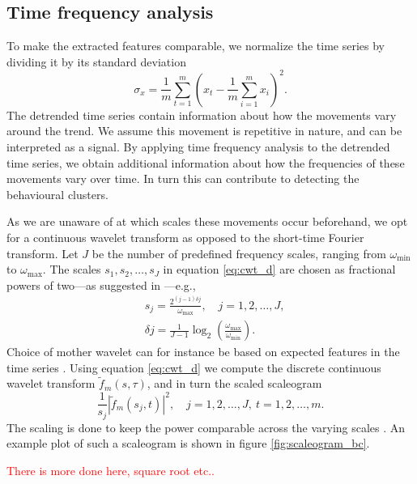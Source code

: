 \documentclass[a4paper, 10pt]{memoir}
\theoremstyle{plain}
\theoremstyle{definition}
\theoremstyle{remark}
\begin{document}
\subsection{Time frequency analysis}
To make the extracted features comparable, we normalize the time series by dividing it by its standard deviation
\begin{equation*}
        \sigma_x = \frac{1}{m}\sum_{t = 1}^{m} \left( x_t - \frac{1}{m}\sum_{i = 1}^{m}x_i \right)^2.
\end{equation*}
The detrended time series contain information about how the movements vary around the trend.
We assume this movement is repetitive in nature, and can be interpreted as a signal.
By applying time frequency analysis to the detrended time series, we obtain additional information about how the frequencies of these movements vary over time.
In turn this can contribute to detecting the behavioural clusters.

As we are unaware of at which scales these movements occur beforehand, we opt for a continuous wavelet transform as opposed to the short-time Fourier transform.
Let $J$ be the number of predefined frequency scales, ranging from $\omega_{\text{min}}$ to $\omega_{\text{max}}$.
The scales $s_1, s_2, \hdots, s_J$ in equation \eqref{eq:cwt_d} are chosen as fractional powers of two—as suggested in \cite{torrence}—e.g.,
\begin{align*}
        &s_j = \frac{2^{(j - 1)\delta j}}{\omega_{\text{max}}}, \quad j = 1, 2, \hdots, J, \\
        & \delta j = \frac{1}{J - 1} \log_2 \left( \frac{\omega_{\text{max}}}{\omega_{\text{min}}} \right).
\end{align*}
Choice of mother wavelet can for instance be based on expected features in the time series \cite{torrence}.
Using equation \eqref{eq:cwt_d} we compute the discrete continuous wavelet transform $\tilde{f}_m(s, \tau)$, and in turn the scaled scaleogram
\begin{equation}\label{eq:s_spec}
       \frac{1}{s_j} \left|\tilde{f}_m(s_j, t) \right|^2, \quad j = 1, 2, \hdots, J, \ t = 1, 2, \hdots, m.
\end{equation}
The scaling is done to keep the power comparable across the varying scales \cite{liu}.
An example plot of such a scaleogram is shown in figure \ref{fig:scaleogram_bc}.

\textcolor{red}{There is more done here, square root etc..}
\end{document}
